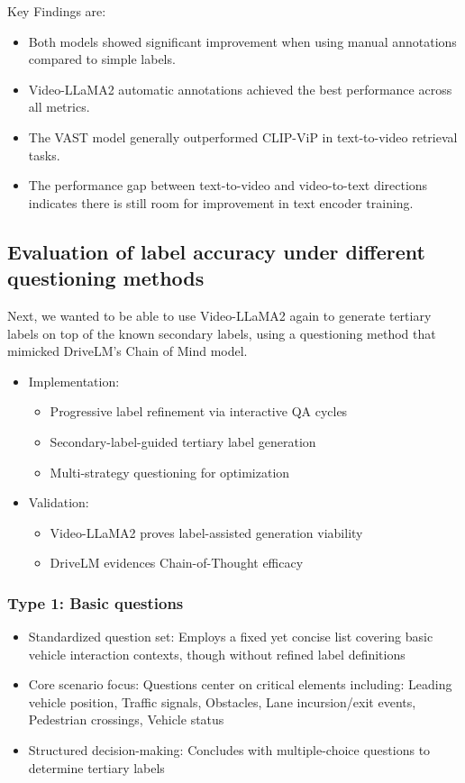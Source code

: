 \documentclass[lettersize,journal]{IEEEtran}
\begin{document}
Key Findings are:
\begin{itemize}
    \item Both models showed significant improvement when using manual annotations compared to simple labels.
    \item Video-LLaMA2 automatic annotations achieved the best performance across all metrics.
    \item The VAST model generally outperformed CLIP-ViP in text-to-video retrieval tasks.
    \item The performance gap between text-to-video and video-to-text directions indicates there is still room for improvement in text encoder training.
\end{itemize}

\subsection{Evaluation of label accuracy under different questioning methods}
Next, we wanted to be able to use Video-LLaMA2 again to generate tertiary labels on top of the known secondary labels, using a questioning method that mimicked DriveLM's Chain of Mind model. 

\begin{itemize}
    \item Implementation:
        \begin{itemize}
            \item Progressive label refinement via interactive QA cycles
            \item Secondary-label-guided tertiary label generation
            \item Multi-strategy questioning for optimization
        \end{itemize}
    \item Validation:
        \begin{itemize}
            \item Video-LLaMA2 proves label-assisted generation viability
            \item DriveLM evidences Chain-of-Thought efficacy
        \end{itemize}
\end{itemize}

\subsubsection{Type 1: Basic questions}

\begin{itemize}
    \item Standardized question set: Employs a fixed yet concise list covering basic vehicle interaction contexts, though without refined label definitions
    \item Core scenario focus: Questions center on critical elements including: Leading vehicle position, Traffic signals, Obstacles, Lane incursion/exit events, Pedestrian crossings, Vehicle status
    \item Structured decision-making: Concludes with multiple-choice questions to determine tertiary labels
\end{itemize}
\end{document}
